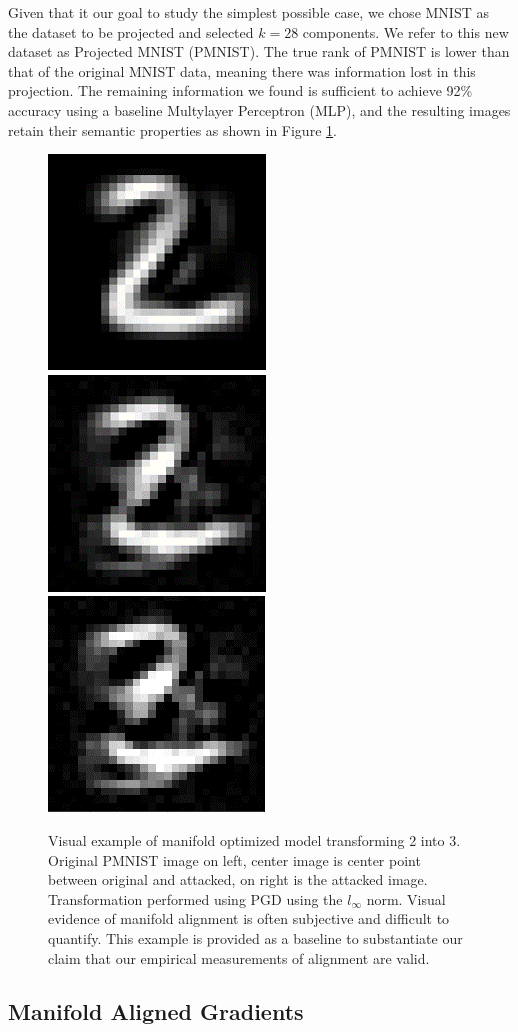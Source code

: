 Given that it our goal to study the simplest possible case, we chose MNIST as the dataset to be projected and selected $k = 28$ components.
We refer to this new dataset as Projected MNIST (PMNIST).
The true rank of PMNIST is lower than that of the original MNIST data, meaning there was information lost in this projection.
The remaining information we found is sufficient to achieve 92\% accuracy using a baseline Multylayer Perceptron (MLP), and the resulting images retain their semantic properties as shown in Figure \ref{fig:perception}.

\begin{figure}[ht]
    \centering
    \includegraphics[width=0.25\linewidth]{c3_figures/pag_0.png}
    \includegraphics[width=0.25\linewidth]{c3_figures/pag_1.png}
    \includegraphics[width=0.25\linewidth]{c3_figures/pag_2.png}
    \caption{Visual example of manifold optimized model transforming 2 into 3. Original PMNIST image on left, center image is center point between original and attacked, on right is the attacked image. Transformation performed using PGD using the $l_\infty$ norm. Visual evidence of manifold alignment is often subjective and difficult to quantify. This example is provided as a baseline to substantiate our claim that our empirical measurements of alignment are valid.}
    \label{fig:perception}
\end{figure}


\subsection{Manifold Aligned Gradients} \label{subsec:ma}

